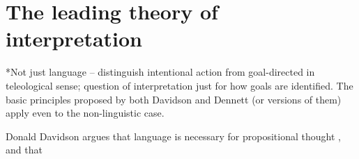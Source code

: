 \documentclass[12pt,a4paper]{extarticle}
\begin{document}
\section{The leading theory of interpretation}

*Not just language -- distinguish intentional action from goal-directed in teleological sense; question of interpretation just for how goals are identified.  The basic principles proposed by both Davidson and Dennett (or versions of them) apply even to the non-linguistic case.

Donald Davidson argues that language is necessary for propositional thought \citep[p.\ 130]{Davidson:1999mo},
and that




\end{document}
